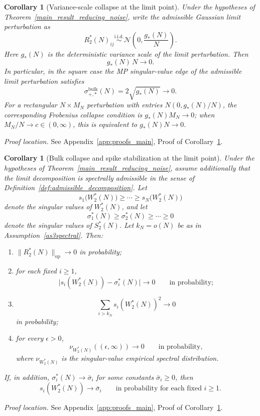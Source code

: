 \documentclass[11pt]{article}
\theoremstyle{plain}
\newtheorem{cor}[thm]{Corollary}
\theoremstyle{definition}
\theoremstyle{remark}
\newcommand{\op}{\mathrm{op}}
\newcommand{\1}{\mathbf{1}}
\newcommand{\proofloc}[1]{\par\noindent\emph{Proof location.} #1\par}
\begin{document}
\begin{cor}[Variance-scale collapse at the limit point]
\label{cor:variance_scale_collapse}
Under the hypotheses of Theorem~\ref{main_result_reducing_noise}, write the admissible Gaussian limit perturbation as
\[
R_2^*(N)_{ij}\overset{\mathrm{i.i.d.}}{\sim}
\mathcal N\!\left(0,\frac{g_*(N)}{N}\right).
\]
Here \(g_*(N)\) is the deterministic variance scale of the limit perturbation.
Then
\[
g_*(N)\,N\to 0.
\]
In particular, in the square case the MP singular-value edge of the admissible limit perturbation satisfies
\[
\sigma_{+,*}^{\mathrm{bulk}}(N)=2\sqrt{g_*(N)}\to 0.
\]
For a rectangular \(N\times M_N\) perturbation with entries \(N(0,g_*(N)/N)\), the corresponding Frobenius collapse condition is \(g_*(N)M_N\to0\); when \(M_N/N\to c\in(0,\infty)\), this is equivalent to \(g_*(N)N\to0\).
\end{cor}
\proofloc{See Appendix~\ref{app:proofs_main}, Proof of Corollary~\ref{cor:variance_scale_collapse}.}

\begin{cor}[Bulk collapse and spike stabilization at the limit point]
\label{cor:bulk_collapse_spike_stabilization}
Under the hypotheses of Theorem~\ref{main_result_reducing_noise}, assume additionally that the limit decomposition is spectrally admissible in the sense of Definition~\ref{def:admissible_decomposition}. Let
\[
s_1\big(W_2^*(N)\big)\ge \cdots \ge s_N\big(W_2^*(N)\big)
\]
denote the singular values of \(W_2^*(N)\), and let
\[
\sigma_1^*(N)\ge \sigma_2^*(N)\ge \cdots \ge 0
\]
denote the singular values of \(S_2^*(N)\). Let \(k_N=o(N)\) be as in Assumption~\ref{as3spectral}.
Then:
\begin{enumerate}[leftmargin=2em]
\item \(\|R_2^*(N)\|_{\op}\to 0\) in probability;
\item for each fixed \(i\ge1\),
\[
\big|s_i(W_2^*(N))-\sigma_i^*(N)\big|\to 0
\qquad\text{in probability};
\]
\item
\[
\sum_{i>k_N} s_i(W_2^*(N))^2\to 0
\]
in probability;
\item for every \(\epsilon>0\),
\[
\nu_{W_2^*(N)}((\epsilon,\infty))\to 0
\qquad\text{in probability},
\]
where \(\nu_{W_2^*(N)}\) is the singular-value empirical spectral distribution.
\end{enumerate}
If, in addition, \(\sigma_i^*(N)\to \bar\sigma_i\) for some constants \(\bar\sigma_i\ge 0\), then
\[
s_i(W_2^*(N))\to \bar\sigma_i
\qquad\text{in probability for each fixed }i\ge1.
\]
\end{cor}
\proofloc{See Appendix~\ref{app:proofs_main}, Proof of Corollary~\ref{cor:bulk_collapse_spike_stabilization}.}
\end{document}
